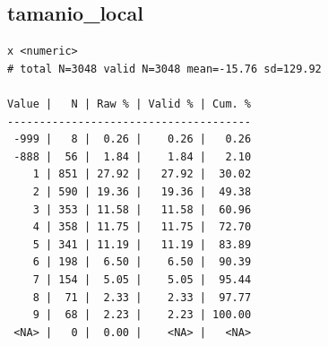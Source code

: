 \documentclass[
  letterpaper,
  DIV=11,
  numbers=noendperiod]{scrreprt}
\newenvironment{Shaded}{\begin{snugshade}}{\end{snugshade}}
\newcommand{\FunctionTok}[1]{\textcolor[rgb]{0.28,0.35,0.67}{#1}}
\newcommand{\NormalTok}[1]{\textcolor[rgb]{0.00,0.23,0.31}{#1}}
\newcommand{\SpecialCharTok}[1]{\textcolor[rgb]{0.37,0.37,0.37}{#1}}
\begin{document}
\hypertarget{tamanio_local}{%
\subsection{tamanio\_local}\label{tamanio_local}}

\begin{Shaded}
\end{Shaded}

\begin{verbatim}
x <numeric> 
# total N=3048 valid N=3048 mean=-15.76 sd=129.92

Value |   N | Raw % | Valid % | Cum. %
--------------------------------------
 -999 |   8 |  0.26 |    0.26 |   0.26
 -888 |  56 |  1.84 |    1.84 |   2.10
    1 | 851 | 27.92 |   27.92 |  30.02
    2 | 590 | 19.36 |   19.36 |  49.38
    3 | 353 | 11.58 |   11.58 |  60.96
    4 | 358 | 11.75 |   11.75 |  72.70
    5 | 341 | 11.19 |   11.19 |  83.89
    6 | 198 |  6.50 |    6.50 |  90.39
    7 | 154 |  5.05 |    5.05 |  95.44
    8 |  71 |  2.33 |    2.33 |  97.77
    9 |  68 |  2.23 |    2.23 | 100.00
 <NA> |   0 |  0.00 |    <NA> |   <NA>
\end{verbatim}
\end{document}
